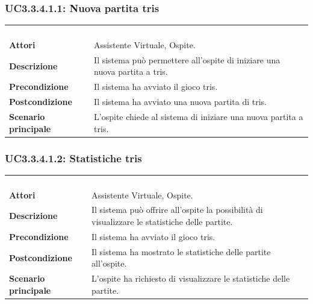 \subsubsection{UC3.3.4.1.1: Nuova partita tris}
\label{UC3.3.4.1.1}
\begin{longtable}{l|p{10cm}}
\rowcolor[gray]{0.8} \multicolumn{2}{c}{} \\
\rowcolor[gray]{0.8} \multicolumn{2}{c}{\textbf{UC3.3.4.1.1 - Nuova partita tris}} \\
\rowcolor[gray]{0.8} \multicolumn{2}{c}{} \\
\hline
&\\
\textbf{Attori} & Assistente Virtuale, Ospite.\\[7pt]
\textbf{Descrizione} & Il sistema può permettere all'ospite di iniziare una nuova partita a tris.\\[7pt]
\textbf{Precondizione} & Il sistema ha avviato il gioco tris.
\\[7pt]
\textbf{Postcondizione} & Il sistema ha avviato una nuova partita di tris.
\\[7pt]
\textbf{Scenario principale} &L'ospite chiede al sistema di iniziare una nuova partita a tris.\\[7pt]\hline
\end{longtable}

\subsubsection{UC3.3.4.1.2: Statistiche tris}
\label{UC3.3.4.1.2}
\begin{longtable}{l|p{10cm}}
\rowcolor[gray]{0.8} \multicolumn{2}{c}{} \\
\rowcolor[gray]{0.8} \multicolumn{2}{c}{\textbf{UC3.3.4.1.2 - Statistiche tris}} \\
\rowcolor[gray]{0.8} \multicolumn{2}{c}{} \\
\hline
&\\
\textbf{Attori} & Assistente Virtuale, Ospite.\\[7pt]
\textbf{Descrizione} & Il sistema può offrire all'ospite la possibilità di visualizzare le statistiche delle partite.\\[7pt]
\textbf{Precondizione} & Il sistema ha avviato il gioco tris.\\[7pt]
\textbf{Postcondizione} & Il sistema ha mostrato le statistiche delle partite all'ospite.\\[7pt]
\textbf{Scenario principale} &L'ospite ha richiesto di visualizzare le statistiche delle partite.\\[7pt]\hline
\end{longtable}

